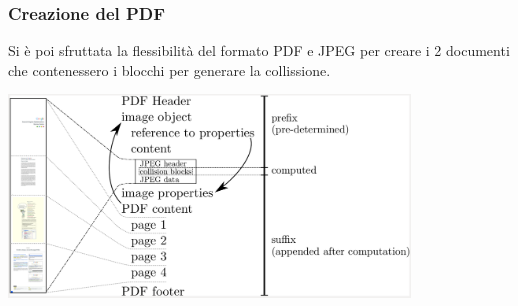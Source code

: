 \begin{frame}
	\frametitle{Creazione del PDF}

	Si è poi sfruttata la flessibilità del formato PDF e JPEG per creare i 2 documenti che contenessero i blocchi per generare la collissione.

	\begin{center}
		\includegraphics[width=0.8\textwidth]{img/2-img/pdf_format.png}
	\end{center}

\end{frame}